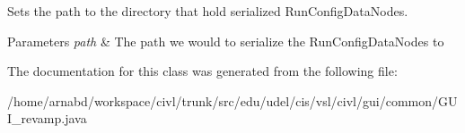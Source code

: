 Sets the path to the directory that hold serialized Run\+Config\+Data\+Nodes. 


\begin{DoxyParams}{Parameters}
{\em path} & The path we would to serialize the Run\+Config\+Data\+Nodes to \\
\hline
\end{DoxyParams}


The documentation for this class was generated from the following file\+:\begin{DoxyCompactItemize}
\item 
/home/arnabd/workspace/civl/trunk/src/edu/udel/cis/vsl/civl/gui/common/G\+U\+I\+\_\+revamp.\+java\end{DoxyCompactItemize}
